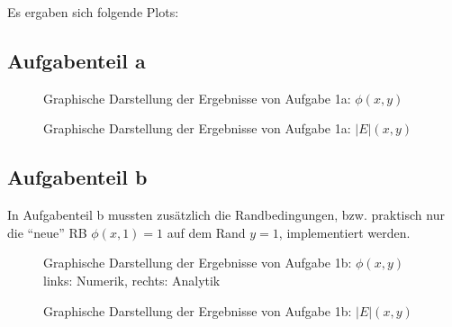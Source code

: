 Es ergaben sich folgende Plots:

\subsection*{Aufgabenteil a}

\begin{landscape}
	\begin{figure}
		\caption{Graphische Darstellung der Ergebnisse von Aufgabe 1a: $\phi(x,y)$}
		\label{fig:aPhi}
	\end{figure}
\end{landscape} 

\begin{landscape}
	\begin{figure}
		\caption{Graphische Darstellung der Ergebnisse von Aufgabe 1a: $|E|(x,y)$}
		\label{fig:aabsE}
	\end{figure}
\end{landscape} 


\subsection*{Aufgabenteil b}
In Aufgabenteil b mussten zusätzlich die Randbedingungen, bzw. praktisch nur die \enquote{neue} RB $\phi(x,1)=1$ auf dem Rand $y=1$, implementiert werden.

\begin{landscape}
	\begin{figure}
		\caption{Graphische Darstellung der Ergebnisse von Aufgabe 1b: $\phi(x,y)$\\links: Numerik, rechts: Analytik}
		\label{fig:bPhi}
	\end{figure}
\end{landscape} 

\begin{landscape}
	\begin{figure}
		\caption{Graphische Darstellung der Ergebnisse von Aufgabe 1b: $|E|(x,y)$}
		\label{fig:babsE}
	\end{figure}
\end{landscape} 

